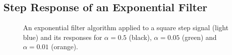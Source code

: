         \subsection{Step Response of an Exponential Filter}\label{sec:A8 step response expo filter}%
            \begin{figure}[H]
                \centering
                
                \caption[Exponential filter applied to square step signal]{An exponential filter algorithm applied to a square step signal (light blue) and its responses
                for \(\alpha = 0.5\) (black), \(\alpha = 0.05\) (green) and \(\alpha = 0.01\) (orange).}
                \label{fig:all step response samples}
            \end{figure}
